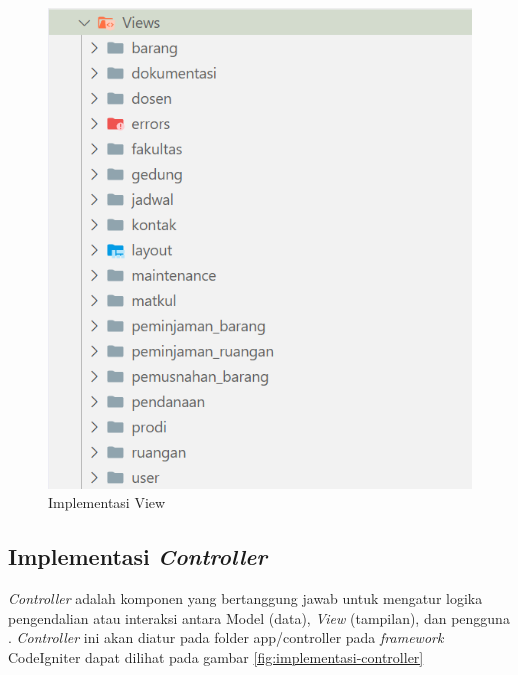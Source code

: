 \begin{figure}
	\centering
	\includegraphics[width=0.82\linewidth]{konten//gambar/implementasi-folder/folder-view.png}
	\caption{Implementasi View}
	\label{fig:implementasi-view}
\end{figure}

\subsection{Implementasi \textit{Controller}}
\textit{Controller} adalah komponen yang bertanggung jawab untuk mengatur logika pengendalian atau interaksi antara Model (data), \textit{View} (tampilan), dan pengguna \cite{rahman2018perancangan}. \textit{Controller} ini akan diatur pada folder app/controller pada \textit{framework} CodeIgniter dapat dilihat pada gambar \ref{fig:implementasi-controller}

